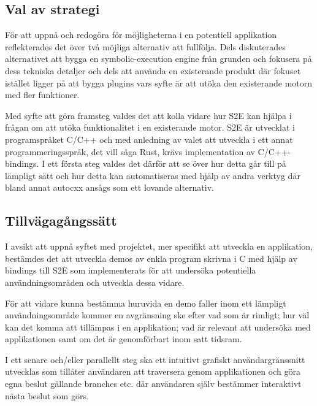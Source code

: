 \subsection{Val av strategi} 
För att uppnå och redogöra för möjligheterna i en
potentiell applikation reflekterades det över två möjliga alternativ att
fullfölja. Dels diskuterades alternativet att bygga en symbolic-execution engine
från grunden och fokusera på dess tekniska detaljer och dels att använda en
existerande produkt där fokuset istället ligger på att bygga plugins vars syfte
är att utöka den existerande motorn med fler funktioner. 

Med syfte att göra framsteg valdes det att kolla vidare hur S2E kan hjälpa i
frågan om att utöka funktionalitet i en existerande motor. S2E är utvecklat
i programspråket C/C++ och med anledning av valet att utveckla i ett
annat programmeringsspråk, det vill säga Rust, krävs implementation av
C/C++-bindings. I ett första steg valdes det därför att se över hur detta går till
på lämpligt sätt och hur detta kan automatiseras med hjälp av andra verktyg
där bland annat autocxx ansågs som ett lovande alternativ. 

\subsection{Tillvägagångssätt} 
I avsikt att uppnå syftet med projektet, mer
specifikt att utveckla en applikation, bestämdes det att utveckla demos av enkla
program skrivna i C med hjälp av bindings till S2E som implementerats för att
undersöka potentiella användningsområden och utveckla dessa vidare. 

För att vidare kunna bestämma huruvida en demo faller inom ett lämpligt
användningsområde kommer en avgränsning ske efter vad som är rimligt; hur väl
kan det komma att tillämpas i en applikation; vad är relevant att undersöka med
applikationen samt om det är genomförbart inom satt tidsram. 

I ett senare och/eller parallellt steg ska ett intuitivt grafiskt användargränssnitt
utvecklas som tillåter användaren att traversera genom applikationen och göra
egna beslut gällande branches etc. där användaren själv bestämmer interaktivt
nästa beslut som görs. 




%  

